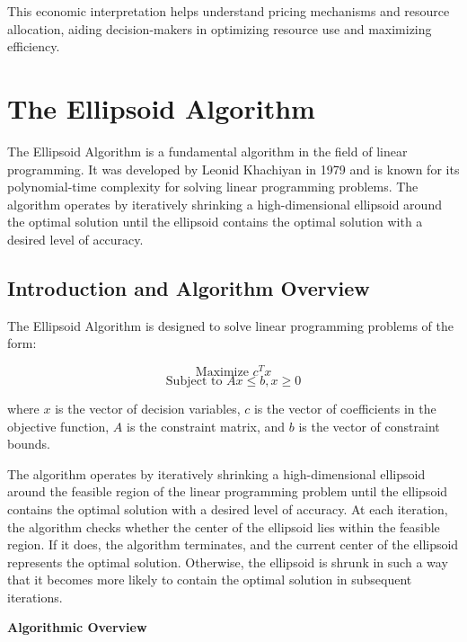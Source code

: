 \documentclass[12pt]{book} %
\begin{document}
This economic interpretation helps understand pricing mechanisms and resource allocation, aiding decision-makers in optimizing resource use and maximizing efficiency.



\section{The Ellipsoid Algorithm}

The Ellipsoid Algorithm is a fundamental algorithm in the field of linear programming. It was developed by Leonid Khachiyan in 1979 and is known for its polynomial-time complexity for solving linear programming problems. The algorithm operates by iteratively shrinking a high-dimensional ellipsoid around the optimal solution until the ellipsoid contains the optimal solution with a desired level of accuracy.

\subsection{Introduction and Algorithm Overview}

The Ellipsoid Algorithm is designed to solve linear programming problems of the form:

\[
\text{Maximize } c^T x
\]
\[
\text{Subject to } Ax \leq b, x \geq 0
\]

where \(x\) is the vector of decision variables, \(c\) is the vector of coefficients in the objective function, \(A\) is the constraint matrix, and \(b\) is the vector of constraint bounds.

The algorithm operates by iteratively shrinking a high-dimensional ellipsoid around the feasible region of the linear programming problem until the ellipsoid contains the optimal solution with a desired level of accuracy. At each iteration, the algorithm checks whether the center of the ellipsoid lies within the feasible region. If it does, the algorithm terminates, and the current center of the ellipsoid represents the optimal solution. Otherwise, the ellipsoid is shrunk in such a way that it becomes more likely to contain the optimal solution in subsequent iterations.

\textbf{Algorithmic Overview}
\end{document}
